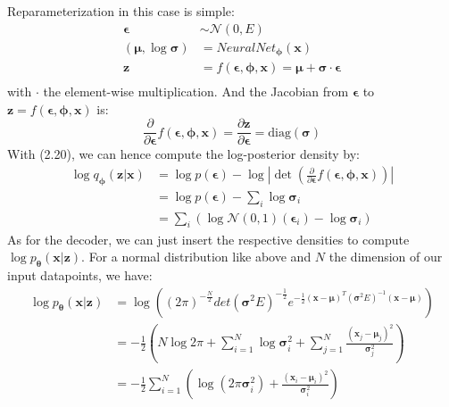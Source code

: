 \documentclass[12pt]{report}
\theoremstyle{definition}
\begin{document}
Reparameterization in this case is simple:
\begin{equation}
\begin{split}
\pmb{\epsilon} & \sim \mathcal{N}(0, E) \\
(\pmb{\mu}, \log \pmb{\sigma}) & = NeuralNet_{\pmb{\phi}}(\mathbf{x}) \\
\mathbf{z} & = f(\pmb{\epsilon}, \pmb{\phi}, \pmb{x}) = \pmb{\mu} + \pmb{\sigma} \cdot \pmb{\epsilon}\\
\end{split}
\end{equation}
with $\cdot$ the element-wise multiplication. And the Jacobian from $\pmb{\epsilon}$ to $\mathbf{z} = f(\pmb{\epsilon}, \pmb{\phi}, \pmb{x})$ is:
\begin{equation}
\frac{\partial}{\partial \pmb{\epsilon}}f(\pmb{\epsilon}, \pmb{\phi}, \mathbf{x}) = \frac{\partial \mathbf{z}}{\partial \pmb{\epsilon}} = \mathrm{diag}(\pmb{\sigma})
\end{equation}
With (2.20), we can hence compute the log-posterior density by:
\begin{equation}
\begin{split}
\log q_{\pmb{\phi}}(\mathbf{z}|\mathbf{x}) & = \log p(\pmb{\epsilon}) - \log \left|\det \left(\frac{\partial}{\partial \pmb{\epsilon}}f(\pmb{\epsilon}, \pmb{\phi}, \mathbf{x})\right)\right| \\
& = \log p(\pmb{\epsilon}) - \sum_i \log \pmb{\sigma}_i \\
& = \sum_i \left(\log \mathcal{N}(0, 1)(\pmb{\epsilon}_i) - \log \pmb{\sigma}_i \right)
\end{split}
\end{equation}
As for the decoder, we can just insert the respective densities to compute $\log p_{\pmb{\theta}}(\mathbf{x}|\mathbf{z})$. For a normal distribution like above and $N$ the dimension of our input datapoints, we have:
\begin{equation}
\begin{split}
\log p_{\pmb{\theta}}(\mathbf{x}|\mathbf{z})
& = \log \left( (2\pi)^{-\frac{N}{2}}det(\pmb{\sigma}^2 E)^{-\frac{1}{2}} e^{-\frac{1}{2}(\mathbf{x}-\pmb{\mu})^T(\pmb{\sigma}^2 E)^{-1}(\mathbf{x}-\pmb{\mu})}\right) \\
& = - \frac{1}{2} \left( N \log2\pi + \sum_{i=1}^N \log\pmb{\sigma}_i^2 + \sum_{j=1}^N \frac{(\mathbf{x}_j - \pmb{\mu}_j)^2}{\pmb{\sigma}_j^2} \right) \\
& = - \frac{1}{2} \sum_{i=1}^N \left(\log(2\pi\pmb{\sigma}_i^2) + \frac{(\mathbf{x}_i - \pmb{\mu}_i)^2}{\pmb{\sigma}_i^2} \right) \\
\end{split}
\end{equation}
\end{document}
